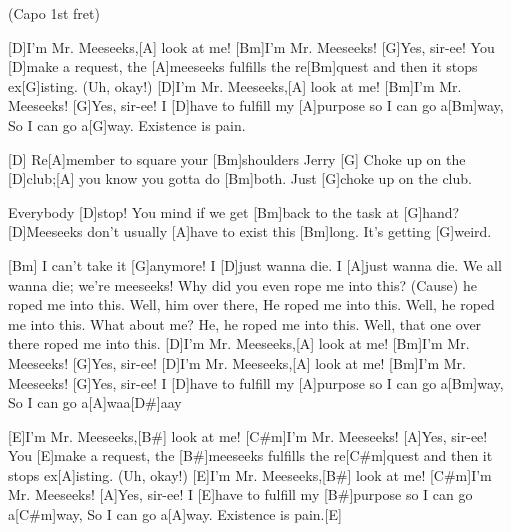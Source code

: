 
{\footnotesize(Capo 1st fret)}

\begin{guitar}
	[D]I'm Mr. Meeseeks,[A] look at me! [Bm]I'm Mr. Meeseeks! [G]Yes, sir-ee!
	You [D]make a request, the [A]meeseeks fulfills the re[Bm]quest and then it stops ex[G]isting. (Uh, okay!)
	[D]I'm Mr. Meeseeks,[A] look at me! [Bm]I'm Mr. Meeseeks! [G]Yes, sir-ee!
	I [D]have to fulfill my [A]purpose so I can go a[Bm]way,
	So I can go a[G]way. Existence is pain.
	
	[D] Re[A]member to square your [Bm]shoulders Jerry [G]{}
	Choke up on the [D]club;[A] you know you gotta do [Bm]both. Just [G]choke up on the club.
	
	 
	
	Everybody [D]stop! You mind if we get [Bm]back to the task at [G]hand? 
	[D]Meeseeks don't usually [A]have to exist this [Bm]long. It's getting [G]weird.
	
	 
	
	[Bm] I can't take it [G]anymore!
	I [D]just wanna die. I [A]just wanna die.
	We all wanna die; we're meeseeks! 
	Why did you even rope me into this?
	(Cause) he roped me into this. Well, him over there, 
	He roped me into this. Well, he roped me into this. 
	What about me? He, he roped me into this.
	Well, that one over there roped me into this.
	\pagebreak
	[D]I'm Mr. Meeseeks,[A] look at me! [Bm]I'm Mr. Meeseeks! [G]Yes, sir-ee!
	[D]I'm Mr. Meeseeks,[A] look at me! [Bm]I'm Mr. Meeseeks! [G]Yes, sir-ee!
	I [D]have to fulfill my [A]purpose so I can go a[Bm]way,
	So I can go a[A]waa[D#]aay
	
	[E]I'm Mr. Meeseeks,[B#] look at me! [C#m]I'm Mr. Meeseeks! [A]Yes, sir-ee!
	You [E]make a request, the [B#]meeseeks fulfills the re[C#m]quest and then it stops ex[A]isting. (Uh, okay!)
	[E]I'm Mr. Meeseeks,[B#] look at me! [C#m]I'm Mr. Meeseeks! [A]Yes, sir-ee!
	I [E]have to fulfill my [B#]purpose so I can go a[C#m]way,
	So I can go a[A]way. Existence is pain.[E]{}
\end{guitar}